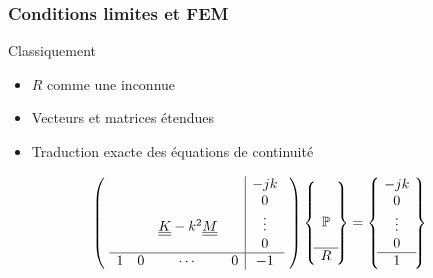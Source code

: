 \documentclass[10pt, compress]{beamer}
\newcommand\GP{\mathbb{P}}
\begin{document}
\begin{frame}
	\frametitle{Conditions limites et FEM}

	\begin{block}{Classiquement}
		\begin{itemize}
			\item $R$ comme une inconnue
			\item Vecteurs et matrices étendues
			\item Traduction exacte des équations de continuité
		\end{itemize}

		\pause

		\begin{equation*}
			\left(~
			\begin{array}{cccc|c}
				&&&&-jk\\
				&&&&0\\
				& & \uul{K} - k^2\uul{M} & &\vdots \\
				&&&&0\\\hline
					1 & 0 & \cdots & 0& -1 \\
			\end{array}
			~\right)
			\left\{~
			\begin{matrix}
				\\
				\\
				\GP\\
				\\\hline
				R
			\end{matrix}
			~\right\} = 
			\left\{~
			\begin{matrix}
				-jk\\
				0\\
				\vdots\\
				0\\\hline
				1
			\end{matrix}
			~\right\}
		\end{equation*}
	\end{block}
\end{frame}
\end{document}
